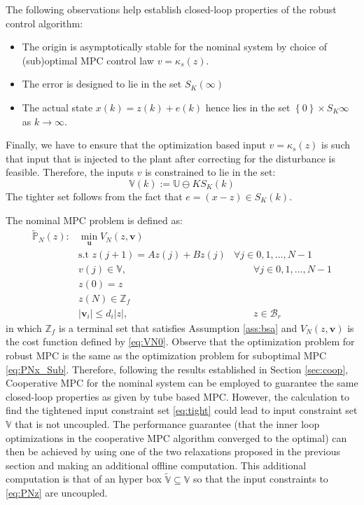 \documentclass[10pt]{article}
\newcommand{\bu}{\mathbf{u}}
\newcommand{\norm}[1]{\vert #1 \vert}
\newcommand{\set}[1]{\left\lbrace #1 \right\rbrace}
\theoremstyle{definition}
\begin{document}
The following observations help establish closed-loop properties of the robust control algorithm:
\begin{itemize}
\item The origin is asymptotically stable for the nominal system by choice of (sub)optimal MPC control law $v = \kappa_s(z)$.
\item The error is designed to lie in the set $S_K(\infty)$
\item The actual state $x(k) = z(k) + e(k)$ hence lies in the set $\set{0} \times S_K{\infty}$ as $k \rightarrow \infty$.
\end{itemize}

Finally, we have to ensure that the optimization based input $v = \kappa_s(z)$ is such that input that is injected to the plant after correcting for the disturbance is feasible. Therefore, the inputs $v$ is constrained to lie in the set:
\begin{equation}
\label{eq:tight}
\mathbb{V}(k) := \mathbb{U} \ominus KS_K(k)
\end{equation}
The tighter set follows from the fact that $e = (x-z) \in
S_K(k)$. 

The nominal MPC problem is defined as:
\begin{align}
\tilde{\mathbb{P}}_N(z): & \min_{\bu}V_N(z,\mathbf{v}) \nonumber \\
& \text{s.t~} z(j+1) = Az(j) + Bz(j)&  \forall j \in 0,1,\ldots,N-1\nonumber\\
& v(j) \in \mathbb{V} \label{eq:PNz},
& \qquad  \forall j \in 0,1,\ldots,N-1 \\
& z(0) = z \nonumber \\
& z(N) \in \mathbb{Z}_f \nonumber \\
& \norm{\mathbf{v}_i} \leq d_i \norm{z} , &\qquad z \in \mathcal{B}_r  \nonumber
\end{align}
in which $\mathbb{Z}_f$ is a terminal set that satisfies Assumption
\ref{ass:bsa} and $V_N(z,\mathbf{v})$ is the cost function defined by
\eqref{eq:VN0}.  Observe that the optimization problem for robust MPC is the same as the optimization problem for suboptimal MPC \eqref{eq:PNx_Sub}. Therefore, following the results established in Section \ref{sec:coop}, Cooperative MPC for the nominal system can be employed to guarantee the same closed-loop properties as given by tube based MPC.  However, the calculation to find the tightened input constraint set \eqref{eq:tight} could lead to input constraint set $\mathbb{V}$ that is not uncoupled. The performance guarantee (that the inner loop optimizations in the cooperative MPC algorithm converged to the optimal) can then be achieved by using one of the two relaxations proposed in the previous section and  making an additional offline computation. This additional computation is that of an hyper box $\tilde{\mathbb{V}} \subseteq \mathbb{V}$ so that the input constraints to \eqref{eq:PNz} are uncoupled.
\end{document}
